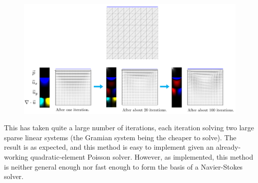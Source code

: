 \begin{figure}[H]
    \centering
    \centerline{\includegraphics[width=1.1\textwidth]{figures/stokes/lid_driven_weakly_incompressible/figure.png}}
    \label{stokes_lid_driven_weakly_incomprssible}
\end{figure}
This has taken quite a large number of iterations, each iteration solving two large sparse linear systems (the Gramian system being the cheaper to solve).
The result is as expected, and this method is easy to implement given an already-working quadratic-element Poisson solver.
However, as implemented, this method is neither general enough nor fast enough to form the basis of a Navier-Stokes solver.



